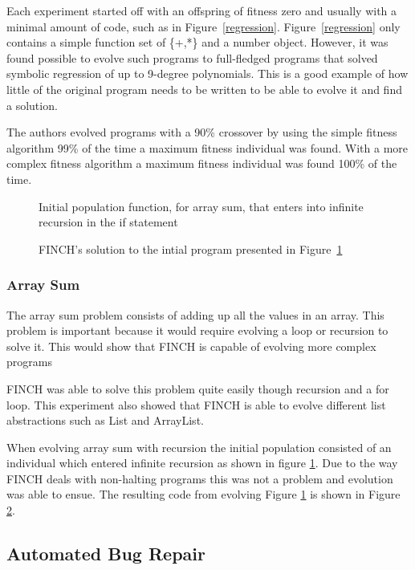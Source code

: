 \documentclass{sig-alternate}
\begin{document}
Each experiment started off with an offspring of fitness zero and usually with a minimal amount of code, such as in Figure~\ref{regression}. Figure~\ref{regression} only contains a simple function set of \{+,*\} and a number object. However, it was found possible  to evolve such programs to full-fledged programs that solved symbolic regression of up to 9-degree polynomials. This is a good example of how little of the original program needs to be written to be able to evolve it and find a solution.

The authors evolved programs with a 90\% crossover by using the simple fitness algorithm 99\% of the time a maximum fitness individual was found. With a more complex fitness algorithm a maximum fitness individual was found 100\% of the time.


\begin{figure}
\centering
{}
\caption{Initial population function, for array sum, that enters into infinite recursion in the if statement}
\label{initial rec}
\end{figure}

\begin{figure}
\centering
{}
\caption{FINCH's solution to the intial program presented in Figure~\ref{initial rec}}
\label{final rec}
\end{figure}

\subsubsection{Array Sum}
The array sum problem consists of adding up all the values in an array. This problem is important because it would require evolving a loop or recursion to solve it. This would show that FINCH is capable of evolving more complex programs\par
FINCH was able to solve this problem quite easily though recursion and a for loop. This experiment also showed that FINCH is able to evolve different list abstractions such as List and ArrayList.

When evolving array sum with recursion the initial population consisted of an individual which entered infinite recursion as shown in figure \ref{initial rec}. Due to the way FINCH deals with non-halting programs this was not a problem and evolution was able to ensue. The resulting code from evolving Figure \ref{initial rec} is shown in Figure \ref{final rec}.


\subsection{Automated Bug Repair}
\end{document}
